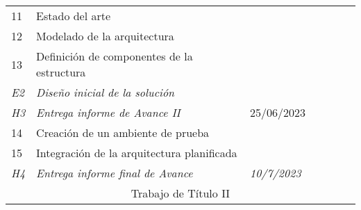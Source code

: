\begin{longtable}[c]{@{}llllllll@{}}
	11                                     & Estado del arte                                     &                                              &                                          &               &                &                  &                 \\
	12                                     & Modelado de la arquitectura                         &                                              &                                          &               &                &                  &                 \\
	13                                     & Definición de componentes de la estructura          &                                              &                                          &               &                &                  &                 \\
	\textit{E2}                            & \textit{Diseño inicial de la solución}              & \textit{}                                    & \textit{}                                & \textit{}     & \textit{}      & \textit{}        & \textit{}       \\
	\textit{H3}                            & \textit{Entrega informe de Avance II}               & \multicolumn{2}{l}{25/06/2023}               &                                          &               &                &                                    \\
	14                                     & Creación de un ambiente de prueba                   &                                              &                                          &               &                &                  &                 \\
	15                                     & Integración de la arquitectura planificada          &                                              &                                          &               &                &                  &                 \\
	\textit{H4}                            & \textit{Entrega informe final de Avance}            & \multicolumn{2}{l}{\textit{10/7/2023}}       & \textit{}                                & \textit{}     & \textit{}      & \textit{}                          \\* \midrule
	\multicolumn{8}{c}{Trabajo de Título II}                                                                                                                                                                                                                     \\* \midrule

\end{longtable}
